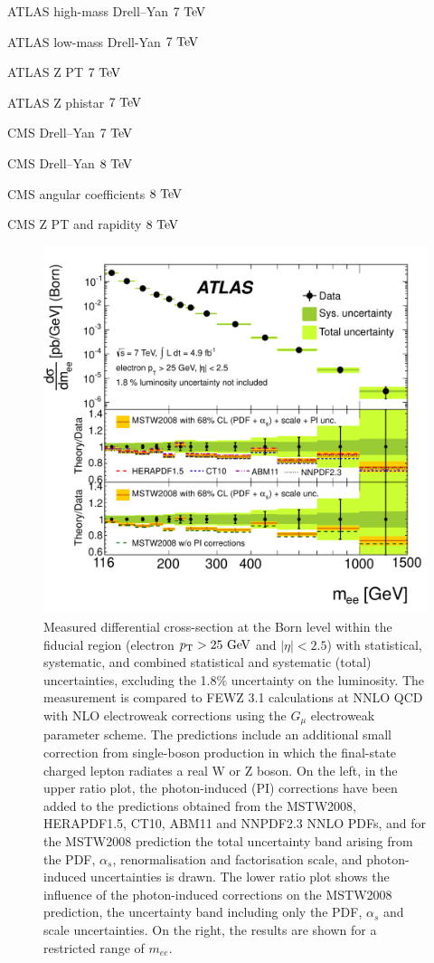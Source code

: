 ATLAS high-mass Drell--Yan $7 \TeV$~\cite{Aad:2013iua} 

ATLAS low-mass Drell-Yan $7 \TeV$~\cite{Aad:2014qja}

ATLAS Z PT $7 \TeV$~\cite{Aad:2014xaa}

ATLAS Z phistar $7 \TeV$~\cite{Aad:2012wfa}

CMS Drell--Yan $7 \TeV$~\cite{Chatrchyan:2013tia}

CMS Drell--Yan $8 \TeV$~\cite{CMS:2014jea}

CMS angular coefficients $8 \TeV$~\cite{Khachatryan:2015paa}

CMS Z PT and rapidity $8 \TeV$~\cite{Khachatryan:2015oaa}

\begin{figure}[p]
    \centering
    \includegraphics[height=0.3\textheight]{figures/ss-inclboson-drellyan-atlas7tev}
    \caption{Measured differential cross-section at the Born level within the fiducial region (electron $\pt > 25 \GeV$ and $|\eta| < 2.5$) with statistical, systematic, and combined statistical and systematic (total) uncertainties, excluding the 1.8\% uncertainty on the luminosity. The measurement is compared to FEWZ 3.1 calculations at NNLO QCD with NLO electroweak corrections using the $G_{\mu}$ electroweak parameter scheme. The predictions include an additional small correction from single-boson production in which the final-state charged lepton radiates a real W or Z boson. On the left, in the upper ratio plot, the photon-induced (PI) corrections have been added to the predictions obtained from the MSTW2008, HERAPDF1.5, CT10, ABM11 and NNPDF2.3 NNLO PDFs, and for the MSTW2008 prediction the total uncertainty band arising from the PDF, $\alpha_s$, renormalisation and factorisation scale, and photon-induced uncertainties is drawn. The lower ratio plot shows the influence of the photon-induced corrections on the MSTW2008 prediction, the uncertainty band including only the PDF, $\alpha_s$ and scale uncertainties. On the right, the results are shown for a restricted range of $m_{ee}$.}

\end{figure}
